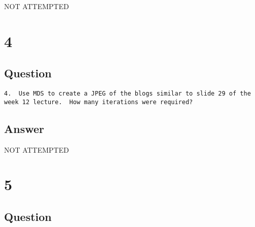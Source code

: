 \documentclass[letterpaper,11pt]{article}
\begin{document}
\begin{center}
\Huge{NOT ATTEMPTED}
\end{center}




\section*{4}

\subsection*{Question}

\begin{verbatim}
4.  Use MDS to create a JPEG of the blogs similar to slide 29 of the 
week 12 lecture.  How many iterations were required?
\end{verbatim}

\subsection*{Answer}

\begin{center}
\Huge{NOT ATTEMPTED}
\end{center}


\clearpage


\section*{5}

\subsection*{Question}
\end{document}
